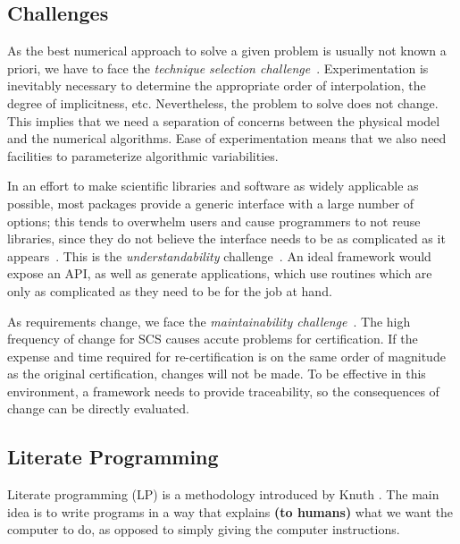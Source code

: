 \documentclass{sig-alternate-05-2015}
\begin{document}
\subsection{Challenges} \label{ssec:challenges}

As the best numerical approach to solve a given problem is usually not known a
priori, we have to face the \textit{technique selection
  challenge}~\cite{Yu2011}. Experimentation is inevitably necessary to determine
the appropriate order of interpolation, the degree of implicitness,
etc. Nevertheless, the problem to solve does not change.  This implies that we
need a separation of concerns between the physical model and the numerical
algorithms.  Ease of experimentation means that we also need facilities to
parameterize algorithmic variabilities.

In an effort to make scientific libraries and software as widely applicable as
possible, most packages provide a generic interface with a large number of
options; this tends to overwhelm users and cause programmers to not reuse
libraries, since they do not believe the interface needs to be as complicated
as it appears~\cite{Dubois2002}. This is the \textit{understandability}
challenge~\cite{Yu2011}.  An ideal framework would expose an
API, as well as generate applications, which use routines which are only as
complicated as they need to be for the job at hand.

As requirements change, we face the \textit{maintainability
challenge}~\cite{Yu2011}.  The high frequency of change for SCS
causes accute problems for certification. If the expense and time required for
re-certification is on the same order of magnitude as the original
certification, changes will not be made. To be effective in this environment, a
framework needs to provide traceability, so the consequences of change can be
directly evaluated.

\subsection{Literate Programming} \label{ssec:literate}

Literate programming (LP) is a methodology introduced by Knuth
\cite{Knuth1984}. The main idea is to write programs in a way that explains 
{\bf (to humans)} what we want the computer to do, as opposed to simply giving
the computer instructions.
\end{document}
